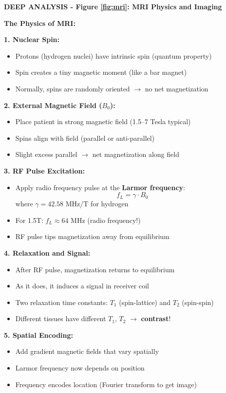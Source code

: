 \documentclass[12pt,a4paper]{article}
\begin{document}
\begin{deepexplanation}
\textbf{DEEP ANALYSIS - Figure \ref{fig:mri}: MRI Physics and Imaging}

\textbf{The Physics of MRI:}

\textbf{1. Nuclear Spin:}
\begin{itemize}
    \item Protons (hydrogen nuclei) have intrinsic spin (quantum property)
    \item Spin creates a tiny magnetic moment (like a bar magnet)
    \item Normally, spins are randomly oriented $\rightarrow$ no net magnetization
\end{itemize}

\textbf{2. External Magnetic Field ($B_0$):}
\begin{itemize}
    \item Place patient in strong magnetic field (1.5--7 Tesla typical)
    \item Spins align with field (parallel or anti-parallel)
    \item Slight excess parallel $\rightarrow$ net magnetization along field
\end{itemize}

\textbf{3. RF Pulse Excitation:}
\begin{itemize}
    \item Apply radio frequency pulse at the \textbf{Larmor frequency}:
    \[
    f_L = \gamma \cdot B_0
    \]
    where $\gamma = 42.58$ MHz/T for hydrogen
    \item For 1.5T: $f_L \approx 64$ MHz (radio frequency!)
    \item RF pulse tips magnetization away from equilibrium
\end{itemize}

\textbf{4. Relaxation and Signal:}
\begin{itemize}
    \item After RF pulse, magnetization returns to equilibrium
    \item As it does, it induces a signal in receiver coil
    \item Two relaxation time constants: $T_1$ (spin-lattice) and $T_2$ (spin-spin)
    \item Different tissues have different $T_1$, $T_2$ $\rightarrow$ \textbf{contrast}!
\end{itemize}

\textbf{5. Spatial Encoding:}
\begin{itemize}
    \item Add gradient magnetic fields that vary spatially
    \item Larmor frequency now depends on position
    \item Frequency encodes location (Fourier transform to get image)
\end{itemize}


\end{deepexplanation}
\end{document}
